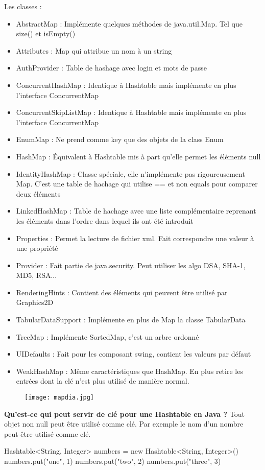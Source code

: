 Les classes :
\begin{itemize}
	\item AbstractMap :  Implémente quelques méthodes de java.util.Map. Tel que size() et 
isEmpty()
	\item Attributes : Map qui attribue un nom à un string
	\item AuthProvider :  Table de hashage avec login et mots de passe
	\item ConcurrentHashMap : Identique à Hashtable mais implémente en plus l'interface 
ConcurrentMap
	\item ConcurrentSkipListMap : Identique à Hashtable mais implémente en plus l'interface ConcurrentMap
	\item EnumMap : Ne prend comme key que des objets de la class Enum
	\item HashMap :  Équivalent à Hashtable mis à part qu'elle permet les éléments null 
	\item IdentityHashMap : Classe spéciale, elle n'implémente pas rigoureusement Map. C'est une table de hachage qui utilise == et non equals pour comparer deux éléments
	\item LinkedHashMap : Table de hachage avec une liste complémentaire reprenant les éléments dans l'ordre dans lequel ils ont été introduit
	\item Properties : Permet la lecture de fichier xml. Fait correspondre une valeur à une  propriété
	\item Provider :  Fait partie de java.security. Peut utiliser les algo DSA, SHA-1, MD5, RSA...
	\item RenderingHints :  Contient des éléments qui peuvent être utilisé par Graphics2D
	\item TabularDataSupport :  Implémente en plus de Map la classe TabularData
	\item TreeMap :  Implémente SortedMap, c'est un arbre ordonné
	\item UIDefaults : Fait pour les composant swing, contient les valeurs par défaut
	\item WeakHashMap : Même caractéristiques que HashMap. En plus retire les entrées dont la clé n'est plus utilisé de manière normal.
\end{itemize}

\begin{figure}[!h]
	\texttt{[image: mapdia.jpg]}
\end{figure}

\textbf{Qu’est-ce qui peut servir de clé pour une Hashtable en Java ? }
Tout objet non null peut être utilisé comme clé. Par exemple le nom d'un nombre peut-être utilisé comme clé.
\begin{algorithm}
Hashtable<String, Integer> numbers
     = new Hashtable<String, Integer>()\;
   numbers.put("one", 1)\;
   numbers.put("two", 2)\;
   numbers.put("three", 3)\;
\end{algorithm}
